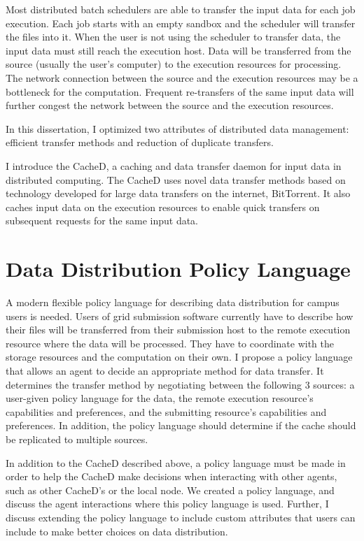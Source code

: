 Most distributed batch schedulers are able to transfer the input data for each job execution.  Each job starts with an empty sandbox and the scheduler will transfer the files into it.  When the user is not using the scheduler to transfer data, the input data must still reach the execution host.  Data will be transferred from the source (usually the user's computer) to the execution resources for processing.  The network connection between the source and the execution resources may be a bottleneck for the computation.  Frequent re-transfers of the same input data will further congest the network between the source and the execution resources.

In this dissertation, I optimized two attributes of distributed data management: efficient transfer methods and reduction of duplicate transfers.

I introduce the CacheD, a caching and data transfer daemon for input data in distributed computing.  The CacheD uses novel data transfer methods based on technology developed for large data transfers on the internet, BitTorrent.  It also caches input data on the execution resources to enable quick transfers on subsequent requests for the same input data.



\section{Data Distribution Policy Language}

A modern flexible policy language for describing data distribution for campus users is needed.  Users of grid submission software currently have to describe how their files will be transferred from their submission host to the remote execution resource where the data will be processed.  They have to coordinate with the storage resources and the computation on their own.  I propose a policy language that allows an agent to decide an appropriate method for data transfer.  It determines the transfer method by negotiating between the following 3 sources: a user-given policy language for the data, the remote execution resource's capabilities and preferences, and the submitting resource's capabilities and preferences.  In addition, the policy language should determine if the cache should be replicated to multiple sources.

In addition to the CacheD described above, a policy language must be made in order to help the CacheD make decisions when interacting with other agents, such as other CacheD's or the local node.  We created a policy language, and discuss the agent interactions where this policy language is used.  Further, I discuss extending the policy language to include custom attributes that users can include to make better choices on data distribution.

